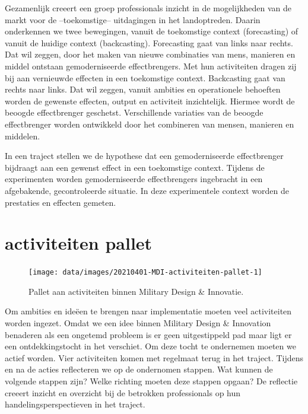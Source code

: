 \documentclass[
]{book}
\begin{document}
Gezamenlijk creeert een groep professionals inzicht in de mogelijkheden van de markt voor de --toekomstige-- uitdagingen in het landoptreden. Daarin onderkennen we twee bewegingen, vanuit de toekomstige context (forecasting) of vanuit de huidige context (backcasting).
Forecasting gaat van links naar rechts. Dat wil zeggen, door het maken van nieuwe combinaties van mens, manieren en middel ontstaan gemoderniseerde effectbrengers. Met hun activiteiten dragen zij bij aan vernieuwde effecten in een toekomstige context.
Backcasting gaat van rechts naar links. Dat wil zeggen, vanuit ambities en operationele behoeften worden de gewenste effecten, output en activiteit inzichtelijk. Hiermee wordt de beoogde effectbrenger geschetst. Verschillende variaties van de beoogde effectbrenger worden ontwikkeld door het combineren van mensen, manieren en middelen.

In een traject stellen we de hypothese dat een gemoderniseerde effectbrenger bijdraagt aan een gewenst effect in een toekomstige context. Tijdens de experimenten worden gemoderniseerde effectbrengers ingebracht in een afgebakende, gecontroleerde situatie. In deze experimentele context worden de prestaties en effecten gemeten.

\hypertarget{activiteiten-pallet}{%
\section{activiteiten pallet}\label{activiteiten-pallet}}

\begin{figure}

{\centering \texttt{[image: data/images/20210401-MDI-activiteiten-pallet-1]} 

}

\caption{Pallet aan activiteiten binnen Military Design \& Innovatie.}\label{fig:unnamed-chunk-7}
\end{figure}

Om ambities en ideëen te brengen naar implementatie moeten veel activiteiten worden ingezet. Omdat we een idee binnen Military Design \& Innovation benaderen als een ongetemd probleem is er geen uitgestippeld pad maar ligt er een ontdekkingstocht in het verschiet. Om deze tocht te ondernemen moeten we actief worden. Vier activiteiten komen met regelmaat terug in het traject. Tijdens en na de acties reflecteren we op de ondernomen stappen. Wat kunnen de volgende stappen zijn? Welke richting moeten deze stappen opgaan? De reflectie creeert inzicht en overzicht bij de betrokken professionals op hun handelingsperspectieven in het traject.
\end{document}
